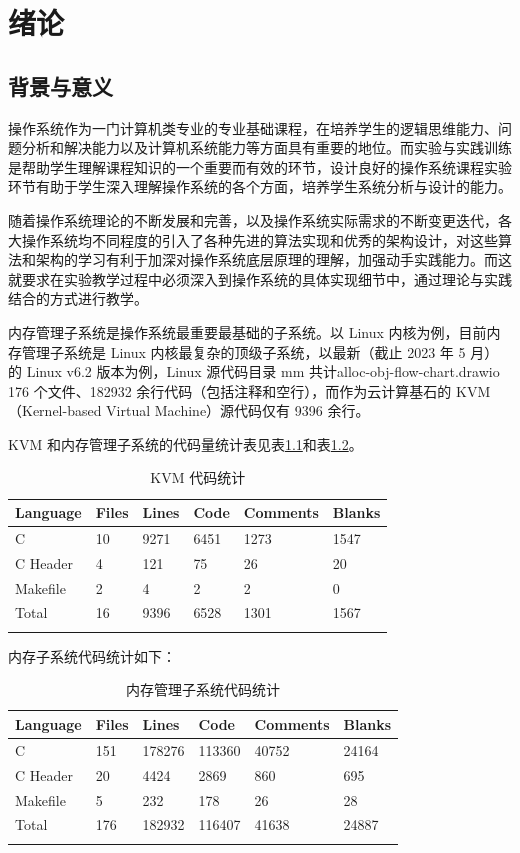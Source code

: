 \documentclass[AutoFakeBold]{LZUThesis}
\begin{document}
\begin{sloppypar}
\mainmatter

\chapter{绪论}


\section{背景与意义}

操作系统作为一门计算机类专业的专业基础课程，在培养学生的逻辑思维能力、问题分析和解决能力以及计算机系统能力等方面具有重要的地位。而实验与实践训练是帮助学生理解课程知识的一个重要而有效的环节，设计良好的操作系统课程实验环节有助于学生深入理解操作系统的各个方面，培养学生系统分析与设计的能力。

随着操作系统理论的不断发展和完善，以及操作系统实际需求的不断变更迭代，各大操作系统均不同程度的引入了各种先进的算法实现和优秀的架构设计，对这些算法和架构的学习有利于加深对操作系统底层原理的理解，加强动手实践能力。而这就要求在实验教学过程中必须深入到操作系统的具体实现细节中，通过理论与实践结合的方式进行教学。

内存管理子系统是操作系统最重要最基础的子系统。以 Linux
内核为例，目前内存管理子系统是 Linux
内核最复杂的顶级子系统，以最新（截止 2023 年 5 月）的 Linux v6.2
版本为例，Linux 源代码目录 mm 共计alloc-obj-flow-chart.drawio 176 个文件、182932
余行代码（包括注释和空行），而作为云计算基石的 KVM（Kernel-based Virtual
Machine）源代码仅有 9396 余行。

KVM 和内存管理子系统的代码量统计表见表\ref{table:kvm-code-stastic}和表\ref{table:mm-code-stastic}。

\begin{longtable}[]{@{}llllll@{}}
\toprule\noalign{}
Language & Files & Lines & Code & Comments & Blanks \\
\midrule\noalign{}
\endhead
\bottomrule\noalign{}
\endlastfoot
C & 10 & 9271 & 6451 & 1273 & 1547 \\
C Header & 4 & 121 & 75 & 26 & 20 \\
Makefile & 2 & 4 & 2 & 2 & 0 \\
Total & 16 & 9396 & 6528 & 1301 & 1567 \\
\label{table:kvm-code-stastic}
\caption{KVM 代码统计}
\end{longtable}

内存子系统代码统计如下：

\begin{longtable}[]{@{}llllll@{}}
\toprule\noalign{}
Language & Files & Lines & Code & Comments & Blanks \\
\midrule\noalign{}
\endhead
\bottomrule\noalign{}
\endlastfoot
C & 151 & 178276 & 113360 & 40752 & 24164 \\
C Header & 20 & 4424 & 2869 & 860 & 695 \\
Makefile & 5 & 232 & 178 & 26 & 28 \\
Total & 176 & 182932 & 116407 & 41638 & 24887 \\
\label{table:mm-code-stastic}
\caption{内存管理子系统代码统计}
\end{longtable}


\end{sloppypar}
\end{document}
